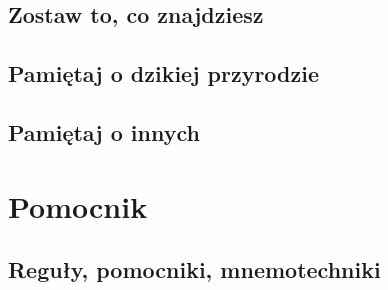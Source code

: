 \documentclass[11pt,fleqn]{book} %
\begin{document}



\chapter{Zostaw to, co znajdziesz}
\label{rule5-leave}


\chapter{Pamiętaj o dzikiej przyrodzie}
\label{rule6-wildlife}


\chapter{Pamiętaj o innych}
\label{rule7-others}


\part{Pomocnik}



\chapter{Reguły, pomocniki, mnemotechniki}
\end{document}
